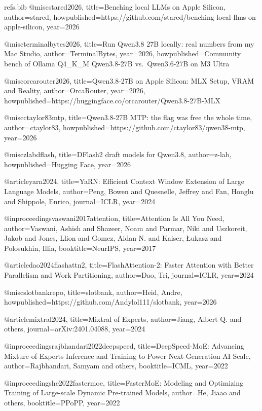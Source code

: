 \begin{filecontents*}[overwrite]{refs.bib}
@misc{stared2026,
  title={Benching local {LLMs} on {Apple} Silicon},
  author={stared},
  howpublished={https://github.com/stared/benching-local-llms-on-apple-silicon},
  year={2026}
}

@misc{terminalbytes2026,
  title={Run {Qwen3.8} 27{B} locally: real numbers from my {Mac} {Studio}},
  author={{TerminalBytes}},
  year={2026},
  howpublished={Community bench of Ollama Q4\_K\_M Qwen3.8-27B vs.\ Qwen3.6-27B on M3 Ultra}
}

@misc{orcarouter2026,
  title={{Qwen3.8-27B} on {Apple} Silicon: {MLX} Setup, {VRAM} and Reality},
  author={{OrcaRouter}},
  year={2026},
  howpublished={https://huggingface.co/orcarouter/Qwen3.8-27B-MLX}
}

@misc{ctaylor83mtp,
  title={{Qwen3.8-27B} {MTP}: the flag was free the whole time},
  author={ctaylor83},
  howpublished={https://github.com/ctaylor83/qwen38-mtp},
  year={2026}
}

@misc{zlabdflash,
  title={{DFlash2} draft models for {Qwen3.8}},
  author={{z-lab}},
  howpublished={Hugging Face},
  year={2026}
}

@article{yarn2024,
  title={{YaRN}: Efficient Context Window Extension of Large Language Models},
  author={Peng, Bowen and Quesnelle, Jeffrey and Fan, Honglu and Shippole, Enrico},
  journal={ICLR},
  year={2024}
}

@inproceedings{vaswani2017attention,
  title={Attention Is All You Need},
  author={Vaswani, Ashish and Shazeer, Noam and Parmar, Niki and Uszkoreit, Jakob and Jones, Llion and Gomez, Aidan N. and Kaiser, {\L}ukasz and Polosukhin, Illia},
  booktitle={NeurIPS},
  year={2017}
}

@article{dao2024flashattn2,
  title={{FlashAttention-2}: Faster Attention with Better Parallelism and Work Partitioning},
  author={Dao, Tri},
  journal={ICLR},
  year={2024}
}

@misc{slotbankrepo,
  title={slotbank},
  author={Heid, Andre},
  howpublished={https://github.com/Andylol111/slotbank},
  year={2026}
}

@article{mixtral2024,
  title={Mixtral of Experts},
  author={Jiang, Albert Q. and others},
  journal={arXiv:2401.04088},
  year={2024}
}

@inproceedings{rajbhandari2022deepspeed,
  title={{DeepSpeed-MoE}: Advancing Mixture-of-Experts Inference and Training to Power Next-Generation {AI} Scale},
  author={Rajbhandari, Samyam and others},
  booktitle={ICML},
  year={2022}
}

@inproceedings{he2022fastermoe,
  title={{FasterMoE}: Modeling and Optimizing Training of Large-scale Dynamic Pre-trained Models},
  author={He, Jiaao and others},
  booktitle={PPoPP},
  year={2022}
}


\end{filecontents*}
